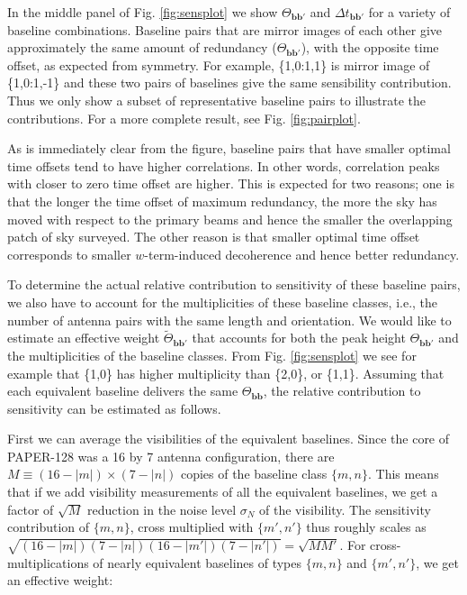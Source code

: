\documentclass[twocolumn,apj,numberedappendix]{emulateapj}
\renewcommand\[{\begin{equation}}
\renewcommand\]{\end{equation}}
\begin{document}
In the middle panel of Fig. \ref{fig:sensplot}
we show $\Theta_{\boldsymbol{bb'}}$ and $\Delta t_{\boldsymbol{bb'}}$ for a variety of baseline combinations. Baseline pairs that are mirror images of each other 
give approximately the same amount of redundancy ($\Theta_{\boldsymbol{bb'}}$), with the opposite time offset, as expected from symmetry. 
For example, \{1,0:1,1\} is mirror image of \{1,0:1,-1\} and these two pairs of baselines
give the same sensibility contribution. Thus we only show a subset of representative baseline pairs to illustrate the contributions. For a more complete result, see Fig. \ref{fig:pairplot}.  

As is immediately clear from the figure, baseline pairs that have smaller optimal time offsets
tend to have higher correlations. In other words, correlation peaks
with closer to zero time offset are higher. This is expected for two reasons;
one is that the longer the time offset of maximum redundancy, the more the sky has moved with respect
to the primary beams and hence the smaller the overlapping patch of sky surveyed. The other reason is that smaller optimal
time offset corresponds to smaller $w$-term-induced decoherence and hence better redundancy. 


To determine the actual relative contribution to sensitivity of these
baseline pairs, we also have to account for the multiplicities of
these baseline classes, i.e., the number of antenna pairs with the
same length and orientation. We would like to estimate an effective weight $\widetilde{\Theta}_{\boldsymbol{bb'}}$ that accounts for both the peak height $\Theta_{\boldsymbol{bb'}}$ and the multiplicities of the baseline classes. From Fig. \ref{fig:sensplot}
we see for example that \{1,0\} has higher multiplicity than \{2,0\},
or \{1,1\}. Assuming that each equivalent baseline delivers
the same $\Theta_{\boldsymbol{bb}}$, the relative contribution to sensitivity can be estimated as follows. 

First we can average the visibilities of the equivalent baselines. Since the core of PAPER-128 was a 16 by 7 antenna configuration, there
are $M\equiv(16-|m|)\times(7-|n|)$ copies of the baseline class $\{m,n\}$. This means
that if we add visibility measurements of all the equivalent baselines,
we get a factor of $\sqrt{M}$ reduction in the noise
level $\sigma_N$ of the visibility. The sensitivity contribution of $\{m,n\}$, cross multiplied with $\{m',n'\}$  thus roughly scales as $\sqrt{(16-|m|)(7-|n|)(16-|m'|)(7-|n'|)}=\sqrt{MM'}$.
For cross-multiplications of nearly equivalent baselines of
types $\{m,n\}$ and $\{m',n'\}$, we get an effective weight: 
\end{document}

